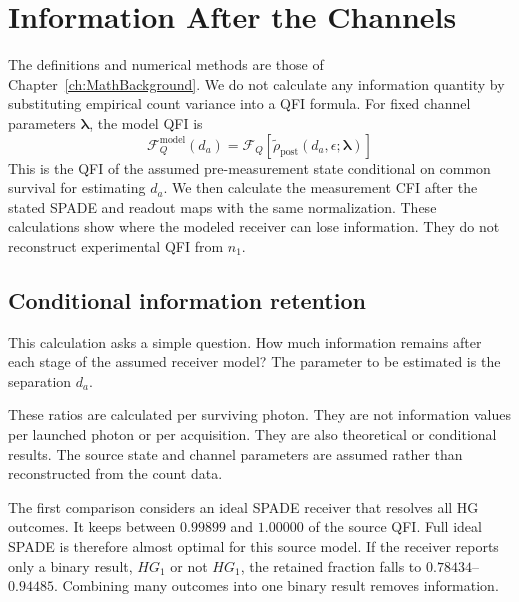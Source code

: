 \section{Information After the Channels}
\label{sec:spade_qfi_role}

The definitions and numerical methods are those of Chapter~\ref{ch:MathBackground}.  We do not calculate any information quantity by substituting empirical count variance into a QFI formula.  For fixed channel parameters $\boldsymbol\lambda$, the model QFI is
\begin{equation}
    \mathcal{F}_{Q}^{\mathrm{model}}(d_a)
    =\mathcal{F}_{Q}\!\left[
        \widetilde{\rho}_{\mathrm{post}}(d_a,\epsilon;\boldsymbol\lambda)
        \right]
    \label{eq:spade_model_qfi}
\end{equation}
This is the QFI of the assumed pre-measurement state conditional on common survival for estimating $d_a$.  We then calculate the measurement CFI after the stated SPADE and readout maps with the same normalization.  These calculations show where the modeled receiver can lose information.  They do not reconstruct experimental QFI from $n_1$.

\subsection{Conditional information retention}

This calculation asks a simple question.  How much information remains after each stage of the assumed receiver model?  The parameter to be estimated is the separation $d_a$.

These ratios are calculated per surviving photon.  They are not information values per launched photon or per acquisition.  They are also theoretical or conditional results.  The source state and channel parameters are assumed rather than reconstructed from the count data.

The first comparison considers an ideal SPADE receiver that resolves all HG outcomes.  It keeps between $0.99899$ and $1.00000$ of the source QFI.  Full ideal SPADE is therefore almost optimal for this source model.  If the receiver reports only a binary result, $HG_1$ or not $HG_1$, the retained fraction falls to $0.78434$--$0.94485$.  Combining many outcomes into one binary result removes information.

